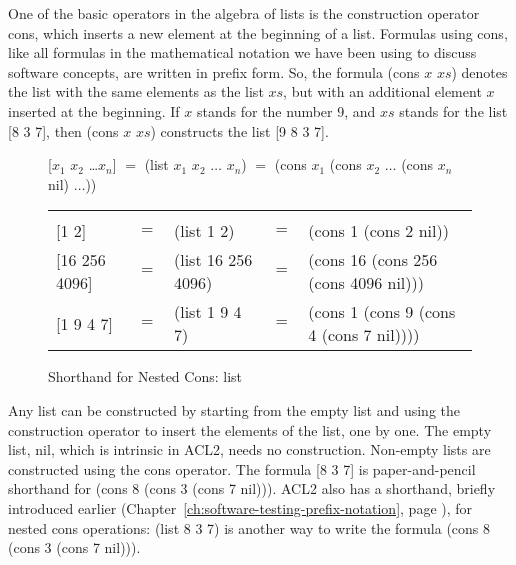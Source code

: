 One of the basic operators in the algebra of lists is the
construction operator
\textsf{cons},
which inserts a new element at the beginning of a list.
Formulas using \textsf{cons}, like all formulas in
the mathematical notation we have been using to discuss software concepts,
are written in prefix form.
So, the formula \textsf{(cons $x$ $xs$)} denotes the list
with the same elements as the list $xs$,
but with an additional element $x$ inserted at the beginning.
If $x$ stands for the number 9,
and $xs$ stands for the list \textsf{[8 3 7]},
then \textsf{(cons $x$ $xs$)} constructs the list \textsf{[9 8 3 7]}.

\begin{figure}
\begin{center}
\vspace{1mm}
\textsf{[$x_1$ $x_2$ \dots $x_n$]} $=$
\textsf{(list $x_1$ $x_2$ $\dots$ $x_n$)} $=$ \textsf{(cons $x_1$ (cons $x_2$ $\dots$ (cons $x_n$ nil) $\dots$))}\\
\addtolength{\tabcolsep}{-4pt}
\begin{tabular}{lclcl}
\hline \\[-1.0em]
\textsf{{[1 2]}}         &$=$ &\textsf{(list 1 2)}        &$=$ &\textsf{(cons 1 (cons 2 nil))}\\
\textsf{{[16 256 4096]}} &$=$ &\textsf{(list 16 256 4096})&$=$ &\textsf{(cons 16 (cons 256 (cons 4096 nil)))}\\
\textsf{{[1 9 4 7]}}     &$=$ &\textsf{(list 1 9 4 7)}    &$=$ &\textsf{(cons 1 (cons 9 (cons 4 (cons 7 nil))))}\\
\end{tabular}
\addtolength{\tabcolsep}{4pt}
\end{center}
\caption{Shorthand for Nested Cons: \textsf{list}}
\label{fig:list-nested-cons}
\end{figure}

Any list can be constructed by starting from the empty list
and using the construction operator to insert the elements of the list, one by one.
The empty list, \textsf{nil}, which is intrinsic in ACL2, needs no construction.
Non-empty lists are constructed using the \textsf{cons} operator.
The formula \textsf{[8 3 7]} is paper-and-pencil shorthand
for \textsf{(cons 8 (cons 3 (cons 7 nil)))}.
ACL2 also has a shorthand, briefly introduced earlier
(Chapter~\ref{ch:software-testing-prefix-notation}, page \pageref{list-op-informal}),
for nested \textsf{cons} operations: \textsf{(list 8 3 7)} is another way to write the formula
\textsf{(cons 8 (cons 3 (cons 7 nil)))}.

